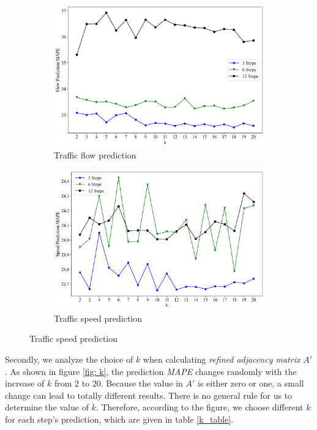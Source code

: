\begin{figure}[htb]
    \centering
    \caption{Variation of STGCN-$A'$ prediction \textit{MAPE} with $k$.}
    \label{fig: k}
    \begin{subfigure}[t]{0.49\linewidth}
        \centering
        \includegraphics[width=\textwidth]{images/k-flow.png}
        \caption{Traffic flow prediction}
        \label{fig: k-flow}
    \end{subfigure}
    \begin{subfigure}[t]{0.49\linewidth}
        \centering
        \includegraphics[width=\textwidth]{images/k-speed.png}
        \caption{Traffic speed prediction}
        \label{fig: k-speed}
    \end{subfigure}
\end{figure}
Secondly, we analyze the choice of $k$ when calculating \textit{refined adjacency matrix} $A'$. As shown in figure \ref{fig: k}, the prediction \textit{MAPE} changes randomly with the increase of $k$ from $2$ to $20$. Because the value in $A'$ is either zero or one, a small change can lead to totally different results. There is no general rule for us to determine the value of $k$. Therefore, according to the figure, we choose different $k$ for each step's prediction, which are given in table \ref{k_table}.
